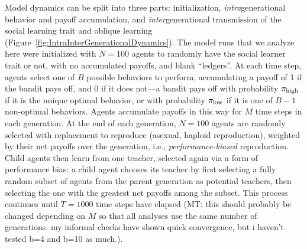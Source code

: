 \documentclass[letterpaper,11.5pt]{scrartcl}
\newcommand{\mt}[1]{{\textcolor{myorange} {({\tiny MT:} #1)}}}
\begin{document}
Model dynamics can be split into three parts: initialization,
\emph{intra}generational behavior and payoff accumulation, and
\emph{inter}generational transmission of the social learning trait and oblique
learning (Figure~\ref{fig:IntraInterGenerationalDynamics}). 
The model runs that we analyze here were initialized with $N=100$ agents
to randomly have the social learner trait or not, with no accumulated payoffs, and
blank ``ledgers''. At each time step, agents select one of $B$ possible behaviors
to perform, accumulating a payoff of 1 if the bandit pays off, and 0 if it does
not---a bandit pays off with probability $\pi_{\mathrm{high}}$ if it is the unique optimal
behavior, or with probability $\pi_{\mathrm{low}}$ if it is one of $B-1$ non-optimal
behaviors. Agents accumulate payoffs in this way for $M$ time steps in each
generation. At the end of each generation, $N=100$ agents are randomly selected with
replacement to reproduce (asexual, haploid reproduction), 
weighted by their net payoffs over the generation,
i.e., \emph{performance-biased} reproduction. Child agents then learn from 
one teacher, selected again via a form of performance bias: a child agent chooses
its teacher by first selecting a fully random subset of agents from the 
parent generation as potential teachers, then selecting the one with the 
greatest net payoffs among the subset. This process continues until $T=1000$
time steps have elapsed \mt{this should probably be changed depending on $M$ so that
    all analyses use the same number of generations. my informal checks have shown quick
convergence, but i haven't tested b=4 and b=10 as much.}.
\end{document}
